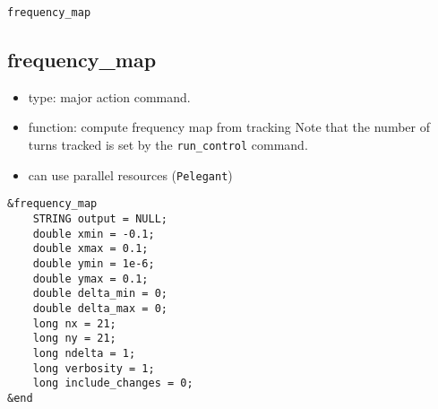 \documentclass[11pt]{article}
\begin{document}
\newpage
\begin{center}{\Large\verb|frequency_map|}\end{center}
\subsection{frequency\_map \label{subsec:frequencymap}}

\begin{itemize}
\item type: major action command.  
\item function: compute frequency map from tracking
      Note that the number of turns tracked is set by the \verb|run_control| command.
\item can use parallel resources (\verb|Pelegant|)
\end{itemize}

\begin{verbatim}
&frequency_map
    STRING output = NULL;
    double xmin = -0.1;
    double xmax = 0.1;
    double ymin = 1e-6;
    double ymax = 0.1;
    double delta_min = 0;
    double delta_max = 0;
    long nx = 21;
    long ny = 21;
    long ndelta = 1;
    long verbosity = 1;
    long include_changes = 0;
&end
\end{verbatim}
\end{document}
